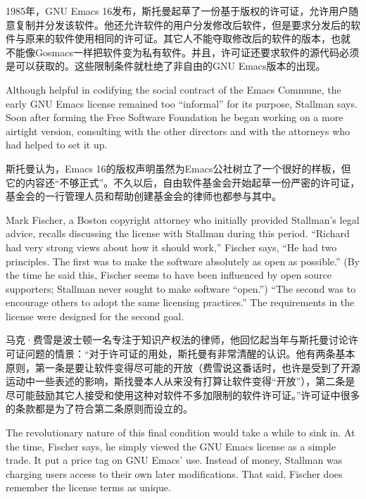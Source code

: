\ifdefined\chs
1985年，GNU Emacs 16发布，斯托曼起草了一份基于版权的许可证，允许用户随意复制并分发该软件。他还允许软件的用户分发修改后软件，但是要求分发后的软件与原来的软件使用相同的许可证。其它人不能夺取修改后的软件的版本，也就 不能像Gosmacs一样把软件变为私有软件。并且，许可证还要求软件的源代码必须是可以获取的。这些限制条件就杜绝了非自由的GNU Emacs版本的出现。
\fi

\ifdefined\eng
Although helpful in codifying the social contract of the Emacs Commune, the early GNU Emacs license remained too ``informal'' for its purpose, Stallman says. Soon after forming the Free Software Foundation he began working on a more airtight version, consulting with the other directors and with the attorneys who had helped to set it up.
\fi

\ifdefined\chs
斯托曼认为，Emacs 16的版权声明虽然为Emacs公社树立了一个很好的样板，但它的内容还“不够正式”。不久以后，自由软件基金会开始起草一份严密的许可证，基金会的一行管理人员和帮助创建基金会的律师也都参与其中。
\fi

\ifdefined\eng
Mark Fischer, a Boston copyright attorney who initially provided Stallman's legal advice, recalls discussing the license with Stallman during this period. ``Richard had very strong views about how it should work,'' Fischer says, ``He had two principles. The first was to make the software absolutely as open as possible.'' (By the time he said this, Fischer seems to have been influenced by open source supporters; Stallman never sought to make software ``open.'') ``The second was to encourage others to adopt the same licensing practices.''  The requirements in the license were designed for the second goal.
\fi

\ifdefined\chs
马克·费雪是波士顿一名专注于知识产权法的律师，他回忆起当年与斯托曼讨论许可证问题的情景：“对于许可证的用处，斯托曼有非常清醒的认识。他有两条基本原则，第一条是要让软件变得尽可能的开放（费雪说这番话时，也许是受到了开源运动中一些表述的影响，斯找曼本人从来没有打算让软件变得“开放”），第二条是尽可能鼓励其它人接受和使用这种对软件不多加限制的软件许可证。”许可证中很多的条款都是为了符合第二条原则而设立的。
\fi

\ifdefined\eng
The revolutionary nature of this final condition would take a while to sink in. At the time, Fischer says, he simply viewed the GNU Emacs license as a simple trade. It put a price tag on GNU Emacs' use. Instead of money, Stallman was charging users access to their own later modifications. That said, Fischer does remember the license terms as unique.
\fi


